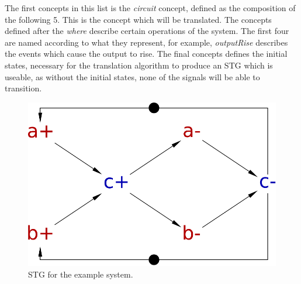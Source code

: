 \documentclass[british,compsoc]{IEEEtran}
\begin{document}
\vspace{3mm}

The first concepts in this list is the \emph{circuit} concept, defined as the composition of the following 5. This is the concept which will be translated.
The concepts defined after the \emph{where} describe certain operations of the system. The first four are named according to what they represent,
for example, \textsf{\textit{\emph{outputRise}}} describes the events which cause the output to rise. The final concepts defines
the initial states, necessary for the translation algorithm to produce an STG which is useable, as without the initial states, none of the signals will be
able to transition.


\begin{figure}[h]
\begin{centering}
\includegraphics[scale=0.25]{Images/stg-cElement}
\par\end{centering}

\protect\caption{\label{fig:cElement STG composition}STG for the example system.}
\end{figure}
\end{document}
